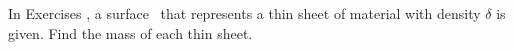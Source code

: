 {\noindent In Exercises}
{, a surface \surfaceS\ that represents a thin sheet of material with density $\delta$ is given. Find the mass of each thin sheet.
}
